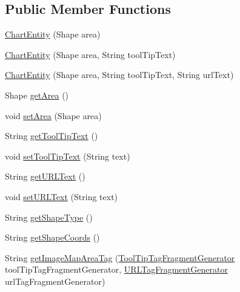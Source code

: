 \subsection*{Public Member Functions}
\begin{DoxyCompactItemize}
\item 
\mbox{\hyperlink{classorg_1_1jfree_1_1chart_1_1entity_1_1_chart_entity_a18114a552c6ec66ceefe8b2599f087c2}{Chart\+Entity}} (Shape area)
\item 
\mbox{\hyperlink{classorg_1_1jfree_1_1chart_1_1entity_1_1_chart_entity_a205d59fbee04bb5787d044b68dd42d07}{Chart\+Entity}} (Shape area, String tool\+Tip\+Text)
\item 
\mbox{\hyperlink{classorg_1_1jfree_1_1chart_1_1entity_1_1_chart_entity_a81905045f673051cba39e27eebd5fe9c}{Chart\+Entity}} (Shape area, String tool\+Tip\+Text, String url\+Text)
\item 
Shape \mbox{\hyperlink{classorg_1_1jfree_1_1chart_1_1entity_1_1_chart_entity_a2b0e5a6a8a9aceabdb45a21c54cf45fe}{get\+Area}} ()
\item 
void \mbox{\hyperlink{classorg_1_1jfree_1_1chart_1_1entity_1_1_chart_entity_addb49c1874de29e883d023334d443f1f}{set\+Area}} (Shape area)
\item 
String \mbox{\hyperlink{classorg_1_1jfree_1_1chart_1_1entity_1_1_chart_entity_a5a9a6d9b933a9737a871f7c7d1b01d01}{get\+Tool\+Tip\+Text}} ()
\item 
void \mbox{\hyperlink{classorg_1_1jfree_1_1chart_1_1entity_1_1_chart_entity_a361333c52d6bc762e1751322ca29f56f}{set\+Tool\+Tip\+Text}} (String text)
\item 
String \mbox{\hyperlink{classorg_1_1jfree_1_1chart_1_1entity_1_1_chart_entity_ad83d3939acf913cd90c2663ec1486beb}{get\+U\+R\+L\+Text}} ()
\item 
void \mbox{\hyperlink{classorg_1_1jfree_1_1chart_1_1entity_1_1_chart_entity_a20fceefdd3aad1dbca97ef628f910559}{set\+U\+R\+L\+Text}} (String text)
\item 
String \mbox{\hyperlink{classorg_1_1jfree_1_1chart_1_1entity_1_1_chart_entity_a5a16ddaa477380a0e60c60c546b211a6}{get\+Shape\+Type}} ()
\item 
String \mbox{\hyperlink{classorg_1_1jfree_1_1chart_1_1entity_1_1_chart_entity_a33831fe492f10323bc27e5e2c1452254}{get\+Shape\+Coords}} ()
\item 
String \mbox{\hyperlink{classorg_1_1jfree_1_1chart_1_1entity_1_1_chart_entity_a3472768e270818c4ff5ba5acc7677a80}{get\+Image\+Map\+Area\+Tag}} (\mbox{\hyperlink{interfaceorg_1_1jfree_1_1chart_1_1imagemap_1_1_tool_tip_tag_fragment_generator}{Tool\+Tip\+Tag\+Fragment\+Generator}} tool\+Tip\+Tag\+Fragment\+Generator, \mbox{\hyperlink{interfaceorg_1_1jfree_1_1chart_1_1imagemap_1_1_u_r_l_tag_fragment_generator}{U\+R\+L\+Tag\+Fragment\+Generator}} url\+Tag\+Fragment\+Generator)

\end{DoxyCompactItemize}
